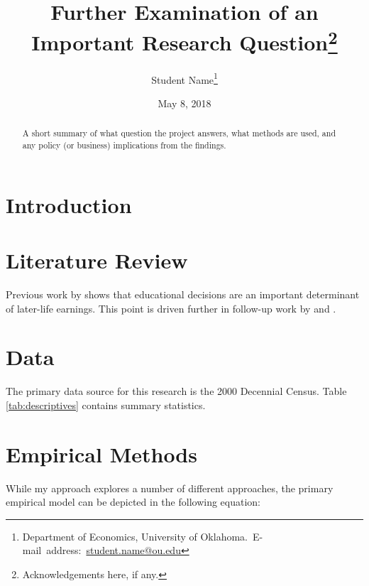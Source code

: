 \documentclass[12pt,english]{article}
\begin{document}
\begin{singlespace}
\title{Further Examination of an Important Research Question\thanks{Acknowledgements here, if any.}}
\end{singlespace}

\author{Student Name\thanks{Department of Economics, University of Oklahoma.\
E-mail~address:~\href{mailto:student.name@ou.edu}{student.name@ou.edu}}}

\date{May 8, 2018}

\maketitle

\begin{abstract}
\begin{singlespace}
A short summary of what question the project answers, what methods are used, and any policy (or business) implications from the findings.
\end{singlespace}

\end{abstract}
\vfill{}


\pagebreak{}


\section{Introduction}\label{sec:intro}
\lipsum[3-5]

\section{Literature Review}\label{sec:litreview}
Previous work by \citet{altonji1993} shows that educational decisions are an important determinant of later-life earnings. This point is driven further in follow-up work by \citet{altonji_al2012} and \citet{altonji_al2016}.

\lipsum[3-5]

\section{Data}\label{sec:data}
The primary data source for this research is the 2000 Decennial Census. Table \ref{tab:descriptives} contains summary statistics.

\lipsum[2-5]


\section{Empirical Methods}\label{sec:methods}
While my approach explores a number of different approaches, the primary empirical model can be depicted in the following equation:
\end{document}
